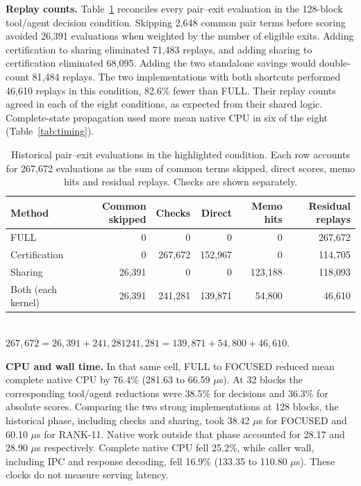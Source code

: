 \documentclass[11pt,letterpaper]{article}
\begin{document}
\textbf{Replay counts.} Table~\ref{tab:counts} reconciles every pair--exit evaluation in the 128-block tool/agent decision condition. Skipping 2,648 common pair terms before scoring avoided 26,391 evaluations when weighted by the number of eligible exits. Adding certification to sharing eliminated 71,483 replays, and adding sharing to certification eliminated 68,095. Adding the two standalone savings would double-count 81,484 replays. The two implementations with both shortcuts performed 46,610 replays in this condition, 82.6\% fewer than FULL. Their replay counts agreed in each of the eight conditions, as expected from their shared logic. Complete-state propagation used more mean native CPU in six of the eight (Table~\ref{tab:timing}).

\begin{table}[htbp]\centering\small
\caption{Historical pair--exit evaluations in the highlighted condition. Each row accounts for 267,672 evaluations as the sum of common terms skipped, direct scores, memo hits and residual replays. Checks are shown separately.}
\label{tab:counts}\par\vspace{3pt}
\setlength{\tabcolsep}{5pt}
\begin{tabular}{@{}lrrrrr@{}}\toprule
Method & Common skipped & Checks & Direct & Memo hits & Residual replays\\\midrule
FULL & 0 & 0 & 0 & 0 & 267,672\\
Certification & 0 & 267,672 & 152,967 & 0 & 114,705\\
Sharing & 26,391 & 0 & 0 & 123,188 & 118,093\\
Both (each kernel) & 26,391 & 241,281 & 139,871 & 54,800 & 46,610\\
\bottomrule\end{tabular}\\[3pt]
\footnotesize $267{,}672=26{,}391+241{,}281$\qquad $241{,}281=139{,}871+54{,}800+46{,}610$.
\end{table}

\textbf{CPU and wall time.} In that same cell, FULL to FOCUSED reduced mean complete native CPU by 76.4\% (281.63 to 66.59 \ensuremath{\mu}s). At 32 blocks the corresponding tool/agent reductions were 38.5\% for decisions and 36.3\% for absolute scores. Comparing the two strong implementations at 128 blocks, the historical phase, including checks and sharing, took 38.42 \ensuremath{\mu}s for FOCUSED and 60.10 \ensuremath{\mu}s for RANK-11. Native work outside that phase accounted for 28.17 and 28.90 \ensuremath{\mu}s respectively. Complete native CPU fell 25.2\%, while caller wall, including IPC and response decoding, fell 16.9\% (133.35 to 110.80 \ensuremath{\mu}s). These clocks do not measure serving latency.
\end{document}
